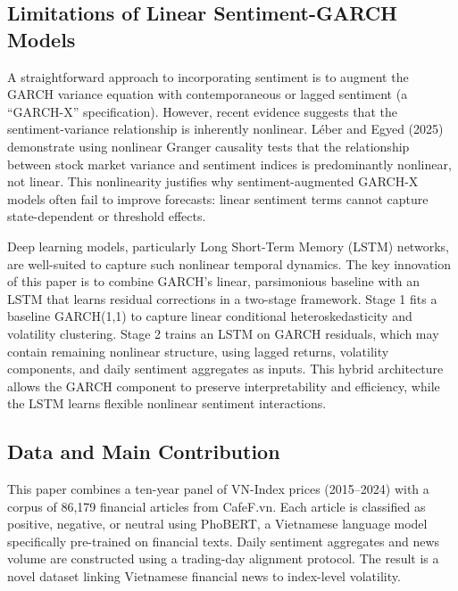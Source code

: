 \subsection{Limitations of Linear Sentiment-GARCH Models}

A straightforward approach to incorporating sentiment is to augment the GARCH variance equation with contemporaneous or lagged sentiment (a ``GARCH-X'' specification). However, recent evidence suggests that the sentiment-variance relationship is inherently nonlinear. Léber and Egyed (2025) demonstrate using nonlinear Granger causality tests that the relationship between stock market variance and sentiment indices is predominantly nonlinear, not linear. This nonlinearity justifies why sentiment-augmented GARCH-X models often fail to improve forecasts: linear sentiment terms cannot capture state-dependent or threshold effects. 

Deep learning models, particularly Long Short-Term Memory (LSTM) networks, are well-suited to capture such nonlinear temporal dynamics. The key innovation of this paper is to combine GARCH's linear, parsimonious baseline with an LSTM that learns residual corrections in a two-stage framework. Stage 1 fits a baseline GARCH(1,1) to capture linear conditional heteroskedasticity and volatility clustering. Stage 2 trains an LSTM on GARCH residuals, which may contain remaining nonlinear structure, using lagged returns, volatility components, and daily sentiment aggregates as inputs. This hybrid architecture allows the GARCH component to preserve interpretability and efficiency, while the LSTM learns flexible nonlinear sentiment interactions.

\subsection{Data and Main Contribution}

This paper combines a ten-year panel of VN-Index prices (2015--2024) with a corpus of 86,179 financial articles from CafeF.vn. Each article is classified as positive, negative, or neutral using PhoBERT, a Vietnamese language model specifically pre-trained on financial texts. Daily sentiment aggregates and news volume are constructed using a trading-day alignment protocol. The result is a novel dataset linking Vietnamese financial news to index-level volatility.

